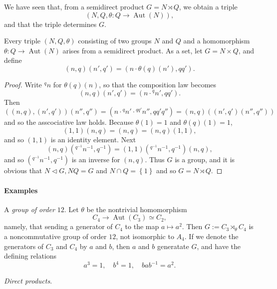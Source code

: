 We have seen that, from a semidirect product \( G = N \rtimes Q \), we obtain a triple
\[
  (N, Q, \theta: Q \to \operatorname{Aut}(N)),
\]
and that the triple determines \( G \).

\begin{proposition}
  Every triple \( (N, Q, \theta) \) consisting of two groups \( N \) and \( Q \) and a homomorphism \( \theta: Q \to \operatorname{Aut}(N) \) arises from a semidirect product.
As a set, let \( G = N \times Q \), and define
\[
  (n, q) (n', q') = (n \cdot \theta(q)(n'), qq').
\]
\end{proposition}
\begin{proof}
  Write \( {}^qn \) for \( \theta(q)(n) \), so that the composition law becomes
  \[
    (n, q)(n', q') = (n\cdot {}^qn', qq').
  \]
  Then
  \[
    ((n, q), (n', q'))(n'', q'') = (n \cdot {}^q n' \cdot {}^{qq'}n'', qq'q'') = (n, q)((n', q')(n'', q''))
  \]
  and so the asscociative law holds.
  Because \( \theta(1) = 1 \) and \( \theta(q)(1) = 1 \),
  \[
    (1, 1) (n, q) = (n, q) = (n, q)(1, 1),
  \]
  and so \( (1, 1) \) is an identity element.
  Next
  \[
    (n, q)({}^{q^{-1}}n^{-1}, q^{-1}) = (1, 1) ({}^{q^{-1}}n^{-1}, q^{-1})(n, q),
  \]
  and so \( ({}^{q^{-1}}n^{-1}, q^{-1}) \) is an inverse for \( (n, q) \).
  Thus \( G \) is a group, and it is obvious that \( N \triangleleft G, N Q = G \) and \( N \cap Q = \left\lbrace 1 \right\rbrace \) and so \( G = N \rtimes Q \).
\end{proof}

\paragraph{Examples}

\begin{example}
  A \emph{group of order }\( 12 \).
  Let \( \theta \) be the nontrivial homomorphism
  \[
    C_4 \to \operatorname{Aut}(C_3) \simeq C_2,
  \]
  namely, that sending a generator of \( C_4 \) to the map \( a \mapsto a^2 \).
  Then \( G := C_3 \rtimes_\theta C_4 \) is a noncommutative group of order \( 12 \), not isomorphic to \( A_4 \).
  If we denote the generators of \( C_3 \) and \( C_4 \) by \( a \) and \( b \), then \( a \) and \( b \) generatate \( G \), and have the defining relations
  \[
    a^3 = 1,\quad b^4 = 1,\quad bab^{-1} = a^2.
  \]
\end{example}

\begin{example}
  \emph{Direct products}.
\end{example}

